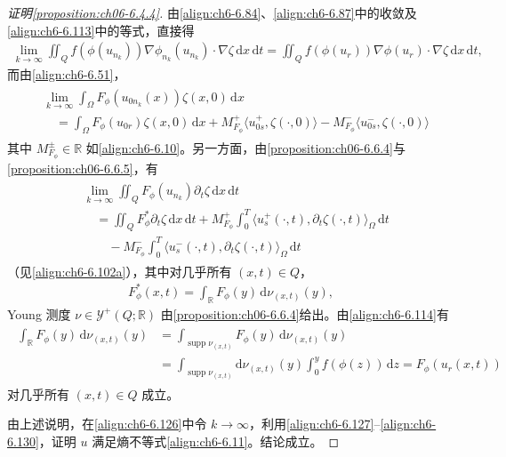 \documentclass[../../main.tex]{subfiles}%
\begin{document}
\begin{proof}[证明\cref{proposition:ch06-6.4.4}]
由\eqref{align:ch6-6.84}、\eqref{align:ch6-6.87}中的收敛及\eqref{align:ch6-6.113}中的等式，直接得
\begin{align}
\lim_{k\to\infty}\iint_Q f(\phi(u_{n_k}))\nabla\phi_{n_k}(u_{n_k})\cdot\nabla\zeta\,\mathrm{d}x\,\mathrm{d}t
=\iint_Q f(\phi(u_r))\nabla\phi(u_r)\cdot\nabla\zeta\,\mathrm{d}x\,\mathrm{d}t, \label{align:ch6-6.127}
\end{align}
而由\eqref{align:ch6-6.51}，
\begin{align}
\begin{aligned}
&\lim_{k\to\infty}\int_\Omega F_\phi(u_{0n_k}(x))\zeta(x,0)\,\mathrm{d}x\\
&\quad=\int_\Omega F_\phi(u_{0r})\zeta(x,0)\,\mathrm{d}x
+M^+_{F_\phi}\langle u^+_{0s},\zeta(\cdot,0)\rangle
-M^-_{F_\phi}\langle u^-_{0s},\zeta(\cdot,0)\rangle
\end{aligned} \label{align:ch6-6.128}
\end{align}
其中 $M^\pm_{F_\phi}\in\mathbb{R}$ 如\eqref{align:ch6-6.10}。另一方面，由\cref{proposition:ch06-6.6.4}与\cref{proposition:ch06-6.6.5}，有
\begin{align}
\begin{aligned}
&\lim_{k\to\infty}\iint_Q F_\phi(u_{n_k})\partial_t\zeta\,\mathrm{d}x\,\mathrm{d}t\\
&\quad=\iint_Q F^*_\phi\partial_t\zeta\,\mathrm{d}x\,\mathrm{d}t
+M^+_{F_\phi}\int_0^T\langle u^+_s(\cdot,t),\partial_t\zeta(\cdot,t)\rangle_\Omega\,\mathrm{d}t\\
&\qquad-M^-_{F_\phi}\int_0^T\langle u^-_s(\cdot,t),\partial_t\zeta(\cdot,t)\rangle_\Omega\,\mathrm{d}t
\end{aligned} \label{align:ch6-6.129}
\end{align}
（见\eqref{align:ch6-6.102a}），其中对几乎所有 $(x,t)\in Q$，
\begin{align*}
F^*_\phi(x,t)=\int_\mathbb{R}F_\phi(y)\,\mathrm{d}\nu_{(x,t)}(y),
\end{align*}
Young 测度 $\nu\in\mathcal{Y}^+(Q;\mathbb{R})$ 由\cref{proposition:ch06-6.6.4}给出。由\eqref{align:ch6-6.114}有
\begin{align}
\begin{aligned}
\int_\mathbb{R}F_\phi(y)\,\mathrm{d}\nu_{(x,t)}(y)
&=\int_{\operatorname{supp}\nu_{(x,t)}}F_\phi(y)\,\mathrm{d}\nu_{(x,t)}(y)\\
&=\int_{\operatorname{supp}\nu_{(x,t)}}\mathrm{d}\nu_{(x,t)}(y)\int_0^y f(\phi(z))\,\mathrm{d}z
=F_\phi(u_r(x,t))
\end{aligned} \label{align:ch6-6.130}
\end{align}
对几乎所有 $(x,t)\in Q$ 成立。

由上述说明，在\eqref{align:ch6-6.126}中令 $k\to\infty$，利用\eqref{align:ch6-6.127}--\eqref{align:ch6-6.130}，证明 $u$ 满足熵不等式\eqref{align:ch6-6.11}。结论成立。
\end{proof}
\end{document}
